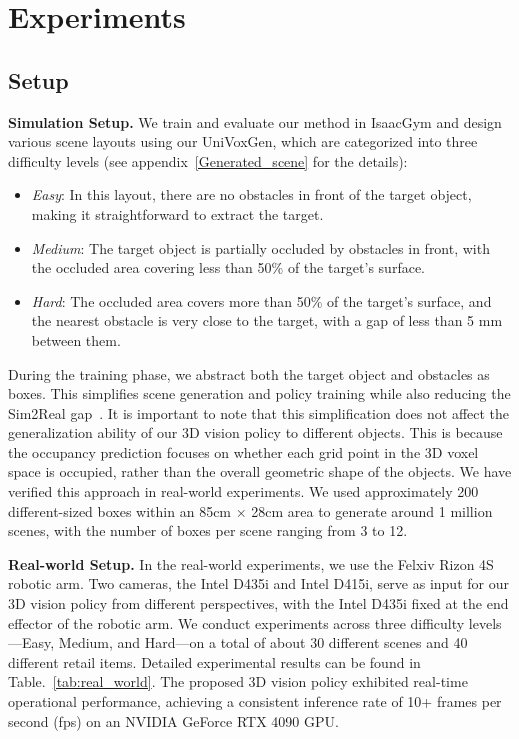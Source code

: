\section{Experiments}

\subsection{Setup}
\textbf{Simulation Setup.} We train and evaluate our method in IsaacGym and design various scene layouts using our UniVoxGen, which are categorized into three difficulty levels (see appendix~\ref{Generated_scene} for the details):\
\begin{itemize}
    \item \textit{Easy}: In this layout, there are no obstacles in front of the target object, making it straightforward to extract the target.
    \item \textit{Medium}: The target object is partially occluded by obstacles in front, with the occluded area covering less than 50\% of the target's surface.
    \item \textit{Hard}: The occluded area covers more than 50\% of the target's surface, and the nearest obstacle is very close to the target, with a gap of less than 5 mm between them.
\end{itemize}

During the training phase, we abstract both the target object and obstacles as boxes. This simplifies scene generation and policy training while also reducing the Sim2Real gap~\cite{zhang2021sim2real}. It is important to note that this simplification does not affect the generalization ability of our 3D vision policy to different objects. This is because the occupancy prediction focuses on whether each grid point in the 3D voxel space is occupied, rather than the overall geometric shape of the objects. We have verified this approach in real-world experiments. We used approximately 200 different-sized boxes within an 85cm × 28cm area to generate around 1 million scenes, with the number of boxes per scene ranging from 3 to 12.



\textbf{Real-world Setup.} In the real-world experiments, we use the Felxiv Rizon 4S robotic arm. Two cameras, the Intel D435i and Intel D415i, serve as input for our 3D vision policy from different perspectives, with the Intel D435i fixed at the end effector of the robotic arm. We conduct experiments across three difficulty levels—Easy, Medium, and Hard—on a total of about 30 different scenes and 40 different retail items. Detailed experimental results can be found in Table.~\ref{tab:real_world}. The proposed 3D vision policy exhibited real-time operational performance, achieving a consistent inference rate of 10+ frames per second (fps) on an NVIDIA GeForce RTX 4090 GPU.






